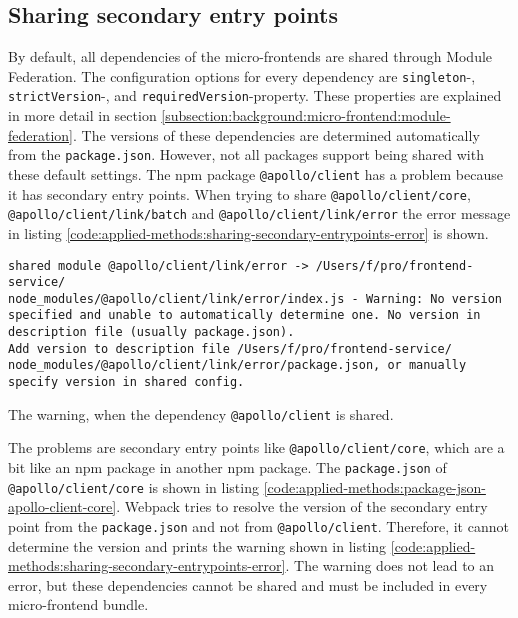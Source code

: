 \subsection{Sharing secondary entry points}

By default, all dependencies of the micro-frontends are shared through Module Federation. The configuration options for every dependency are \texttt{singleton}-, \texttt{strictVersion}-, and \texttt{requiredVersion}-property. These properties are explained in more detail in section \ref{subsection:background:micro-frontend:module-federation}. The versions of these dependencies are determined automatically from the \texttt{package.json}. However, not all packages support being shared with these default settings. The npm package \texttt{@apollo/client} has a problem because it has secondary entry points. When trying to share \texttt{@apollo/client/core}, \texttt{@apollo/client/link/batch} and \texttt{@apollo/client/link/error} the error message in listing \ref{code:applied-methods:sharing-secondary-entrypoints-error} is shown.

\ifshowListings
\begin{listing}[H]
    \begin{verbatim}
shared module @apollo/client/link/error -> /Users/f/pro/frontend-service/
node_modules/@apollo/client/link/error/index.js - Warning: No version 
specified and unable to automatically determine one. No version in 
description file (usually package.json).
Add version to description file /Users/f/pro/frontend-service/
node_modules/@apollo/client/link/error/package.json, or manually 
specify version in shared config.
    \end{verbatim}
    \caption{The warning, when the dependency \texttt{@apollo/client} is shared.}\label{code:applied-methods:sharing-secondary-entrypoints-error}
\end{listing}
\fi


\noindent The problems are secondary entry points like \texttt{@apollo/client/core}, which are a bit like an npm package in another npm package. The \texttt{package.json} of \texttt{@apollo/client/core} is shown in listing \ref{code:applied-methods:package-json-apollo-client-core}. Webpack tries to resolve the version of the secondary entry point from the \texttt{package.json} and not from \texttt{@apollo/client}. Therefore, it cannot determine the version and prints the warning shown in listing \ref{code:applied-methods:sharing-secondary-entrypoints-error}. The warning does not lead to an error, but these dependencies cannot be shared and must be included in every micro-frontend bundle.

